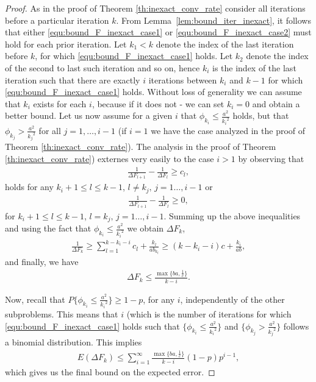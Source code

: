 \documentclass[11pt]{article}
\numberwithin{equation}{section}
\begin{document}
\begin{proof}
As in  the proof of Theorem \ref{th:inexact_conv_rate} consider all iterations before a particular iteration $k$.  From Lemma~\ref{lem:bound_iter_inexact}, it follows that either \eqref{equ:bound_F_inexact_case1} or \eqref{equ:bound_F_inexact_case2} must hold for each prior iteration. 
       Let $k_1 <k$  denote the index of the last iteration before $k$,  for which \eqref{equ:bound_F_inexact_case1} holds. Let $k_2$ denote the index of the second to last such iteration and so on, hence $k_i$ is the index of the last iteration such that there are exactly $i$ iterations between $k_i$ and 
       $k-1$ for which \eqref{equ:bound_F_inexact_case1} holds. Without loss of generality we can assume that $k_i$ exists for each $i$, because if it does not - we can set $k_i=0$ and obtain a better bound. 
       Let us now assume for a given $i$ that $\phi_{k_i} \leq \frac{a^2}{{k_i}^2}$ holds, but that $\phi_{k_j} > \frac{a^2}{{k_j}^2}$ for all $j=1,\ldots, i-1$ (if $i=1$ we have the case analyzed in the proof of Theorem \ref{th:inexact_conv_rate}). The analysis in the proof of Theorem \ref{th:inexact_conv_rate}) externes very easily to the case  $i>1$ by observing that 
       \begin{align*}
	    \frac{1}{\Delta F_{l+1}} - \frac{1}{\Delta F_{l}} \geq c_l, 
	\end{align*}
	holds for any $k_i+1\leq l\leq k-1$, $l\neq k_j,\, j=1\ldots, i-1$ or 
	 \begin{align*}
	    \frac{1}{\Delta F_{l+1}} - \frac{1}{\Delta F_{l}} \geq 0, 
	\end{align*}
	for $k_i+1\leq l\leq k-1$, $l= k_j,\, j=1\ldots, i-1$. 
	Summing up the above inequalities  and using the fact that $\phi_{k_i} \leq \frac{a^2}{{k_i}^2}$ we obtain 
	$\Delta F_{k}$, 
	\begin{align}\label{eq:finalsum}
	    \frac{1}{\Delta F_{k }} \geq    
	    \sum_{l=1}^{k-k_i-i}c_l+ \frac{k_l} {a b_{k_l} }\geq   (k-k_i-i)c+ \frac{k_i} {a b },
	\end{align}
	and finally, we have 
		\begin{align}\label{eq:finalsum}
	    \Delta F_{k } \leq    \frac{\max\{ba, \frac{1}{c}\}}{k-i}. 
	\end{align}

	Now, recall that  $P\{\phi_{k_i} \leq \frac{a^2}{{k_i}^2}\}\geq 1-p$, for any $i$, independently of the other subproblems. This means that $i$ (which is the number of iterations for which  \eqref{equ:bound_F_inexact_case1} holds such that $\{\phi_{k_i} \leq \frac{a^2}{{k_i}^2}\}$ and $\{\phi_{k_j} > \frac{a^2}{{k_j}^2}\}$
	follows a binomial distribution.  This implies
		\begin{align}\label{eq:finalsum}
	    E(\Delta F_{k }) \leq  \sum_{i=1}^\infty  \frac{\max\{ba, \frac{1}{c}\}}{k-i}(1-p)p^{i-1},
	\end{align}
which gives us the final bound on the expected error. 

	
\end{proof}
\end{document}
